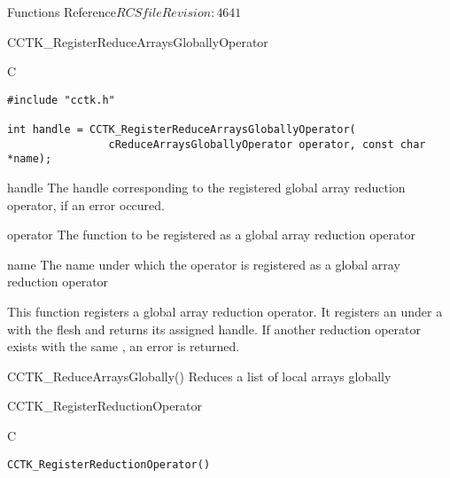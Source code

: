 \begin{cactuspart}{ Functions Reference}{$RCSfile$}{$Revision: 4641 $}
\begin{FunctionDescription}{CCTK\_RegisterReduceArraysGloballyOperator}
\begin{SynopsisSection}
\begin{Synopsis}{C}
\begin{verbatim}
#include "cctk.h"

int handle = CCTK_RegisterReduceArraysGloballyOperator(
                cReduceArraysGloballyOperator operator, const char *name);
\end{verbatim}
\end{Synopsis}
\end{SynopsisSection}

\begin{ResultSection}
\begin{Result}{handle}
The handle corresponding to the registered global array reduction operator, 
if an error occured.
\end{Result}
\end{ResultSection}

\begin{ParameterSection}
\begin{Parameter}{operator}
The function to be registered as a global array reduction operator
\end{Parameter}
\begin{Parameter}{name}
The name under which the operator is registered as a global array reduction operator
\end{Parameter}
\end{ParameterSection}

\begin{Discussion}
This function registers a global array reduction operator. It registers an 
under a  with the flesh and returns its assigned handle. If another reduction
operator exists with the same , an error is returned.
\end{Discussion}

\begin{SeeAlsoSection}
\begin{SeeAlso}{CCTK\_ReduceArraysGlobally()}
Reduces a list of local arrays globally
\end{SeeAlso}
\end{SeeAlsoSection}
\end{FunctionDescription}

\begin{FunctionDescription}{CCTK\_RegisterReductionOperator}{}
\label{CCTK-RegisterReductionOperator}
\begin{SynopsisSection}
\begin{Synopsis}{C}
\begin{verbatim}CCTK_RegisterReductionOperator()\end{verbatim}
\end{Synopsis}
\end{SynopsisSection}
\end{FunctionDescription}



\end{cactuspart}
